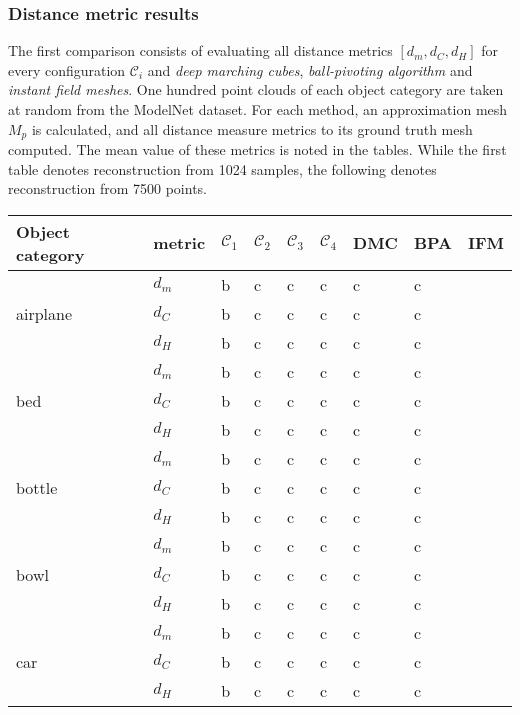 \subsubsection*{Distance metric results}
    The first comparison consists of evaluating all distance metrics $[d_m, d_C, d_H]$ for every configuration
    $\mathcal{C}_i$ and \emph{deep marching cubes}, \emph{ball-pivoting algorithm} and \emph{instant field meshes}.
    One hundred point clouds of each object category are taken at random from the ModelNet dataset. For each method,
    an approximation mesh $M_{p}$ is calculated, and all distance measure metrics to its ground truth mesh computed.
    The mean value of these metrics is noted in the tables. While the first table denotes reconstruction from 1024 
    samples, the following denotes reconstruction from 7500 points.
\begin{center}
     \label{tab:distance1024} 
    \begin{tabular}{| l | p{1.1cm} | p{0.8cm} | p{0.8cm} | p{0.8cm} | p{0.8cm} | p{0.9cm} | p{0.9cm} | p{0.9cm} |}
        \hline
        Object category& metric& $\mathcal{C}_1$ & $\mathcal{C}_2$ & $\mathcal{C}_3$ & $\mathcal{C}_4$ & DMC & BPA & IFM \\ \hline
        \multirow{3}{*}{airplane}&$d_m$&b&c&c&c&c&c&\\
        &$d_C$&b&c&c&c&c&c&\\
        &$d_H$&b&c&c&c&c&c&\\
        \hline
        \multirow{3}{*}{bed}&$d_m$&b&c&c&c&c&c&\\
        &$d_C$&b&c&c&c&c&c&\\
        &$d_H$&b&c&c&c&c&c&\\
        \hline
        \multirow{3}{*}{bottle}&$d_m$&b&c&c&c&c&c&\\
        &$d_C$&b&c&c&c&c&c&\\
        &$d_H$&b&c&c&c&c&c&\\
        \hline
        \multirow{3}{*}{bowl}&$d_m$&b&c&c&c&c&c&\\
        &$d_C$&b&c&c&c&c&c&\\
        &$d_H$&b&c&c&c&c&c&\\
        \hline
        \multirow{3}{*}{car}&$d_m$&b&c&c&c&c&c&\\
        &$d_C$&b&c&c&c&c&c&\\
        &$d_H$&b&c&c&c&c&c&\\

\end{tabular}
\end{center}
